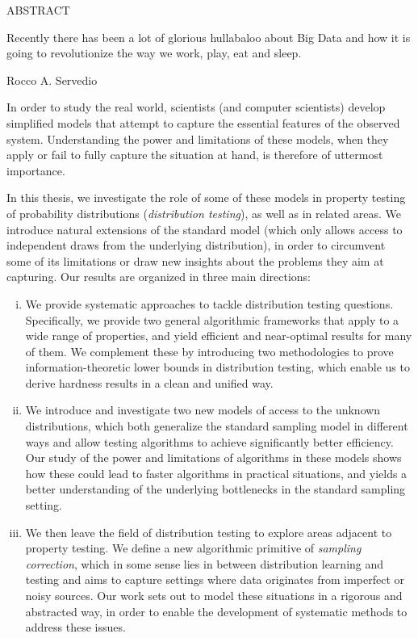 
\thispagestyle{empty} %
\begin{center}
  ABSTRACT

  \@title

  \@author
\end{center}

\epigraph{Recently there has been a lot of glorious hullabaloo about Big Data and how it is going to revolutionize the way we work, play, eat and sleep.}{Rocco A. Servedio}

In order to study the real world, scientists (and computer scientists) develop simplified models that attempt to capture the essential features of the observed system.
Understanding the power and limitations of these models, when they apply or fail to fully capture the situation at hand, is therefore of uttermost importance.

In this thesis, we investigate the role of some of these models in property testing of probability distributions (\emph{distribution testing}), as well as in related areas. We introduce natural extensions of the standard
model (which only allows access to independent draws from the underlying distribution), in order to circumvent some of its limitations or draw new insights about the
problems they aim at capturing. Our results are organized in three main directions:

\begin{enumerate}[(i)]
  \item We provide systematic approaches to tackle distribution testing questions. Specifically, we provide two general algorithmic frameworks that apply to a wide range of properties, and yield efficient and near-optimal results for many of them. We complement these by introducing two methodologies to prove information-theoretic lower bounds in distribution testing, which enable us to derive hardness results in a clean and unified way.
  
  \item We introduce and investigate two new models of access to the unknown distributions, which both generalize the standard sampling model in different ways and allow testing algorithms to achieve significantly better efficiency. Our study of the power and limitations of algorithms in these models shows how these could lead to faster algorithms in practical situations, and  yields a better understanding of the underlying bottlenecks in the standard sampling setting.

  \item We then leave the field of distribution testing to explore areas adjacent to property testing. We define a new algorithmic primitive of \emph{sampling correction}, which in some sense lies in between distribution learning and testing and aims to capture settings where data originates from imperfect or noisy sources. Our work sets out to model these situations in a rigorous and abstracted way, in order to enable the development of systematic methods to address these issues.
\end{enumerate}
